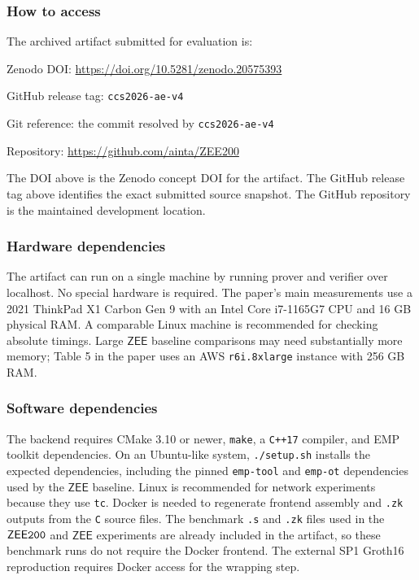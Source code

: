 \documentclass[nonacm,sigconf]{acmart}
\newcommand{\oursystem}{$\mathsf{ZEE}\tt{200}$\xspace}
\newcommand{\zee}[0]{\ensuremath{\mathsf{ZEE}}\xspace}
\newcommand{\artifactdoi}{\url{https://doi.org/10.5281/zenodo.20575393}}
\newcommand{\artifacttag}{\texttt{ccs2026-ae-v4}}
\newcommand{\artifactcommit}{the commit resolved by \artifacttag}
\begin{document}
\subsubsection{How to access}

The archived artifact submitted for evaluation is:
\begin{compactitem}
\item Zenodo DOI: \artifactdoi
\item GitHub release tag: \artifacttag
\item Git reference: \artifactcommit
\item Repository: \url{https://github.com/ainta/ZEE200}
\end{compactitem}

The DOI above is the Zenodo concept DOI for the artifact. The GitHub
release tag above identifies the exact submitted source snapshot. The
GitHub repository is the maintained development location.

\subsubsection{Hardware dependencies}

The artifact can run on a single machine by running prover and verifier
over localhost. No special hardware is required. The paper's main
measurements use a 2021 ThinkPad X1 Carbon Gen 9 with an Intel Core
i7-1165G7 CPU and 16 GB physical RAM. A comparable Linux machine is
recommended for checking absolute timings. Large \zee baseline
comparisons may need substantially more memory; Table 5 in the paper
uses an AWS \texttt{r6i.8xlarge} instance with 256 GB RAM.

\subsubsection{Software dependencies}

The backend requires CMake 3.10 or newer, \texttt{make}, a {\tt C++17}
compiler, and EMP toolkit dependencies. On an Ubuntu-like system,
\texttt{./setup.sh} installs the expected dependencies, including the
pinned \texttt{emp-tool} and \texttt{emp-ot} dependencies used by the
\zee baseline. Linux is recommended for network experiments because
they use \texttt{tc}. Docker is needed to regenerate frontend assembly
and \texttt{.zk} outputs from the {\tt C} source files. The benchmark
\texttt{.s} and \texttt{.zk} files used in the \oursystem and \zee
experiments are already included in the artifact, so these benchmark
runs do not require the Docker frontend. The external SP1 Groth16
reproduction requires Docker access for the wrapping step.
\end{document}
